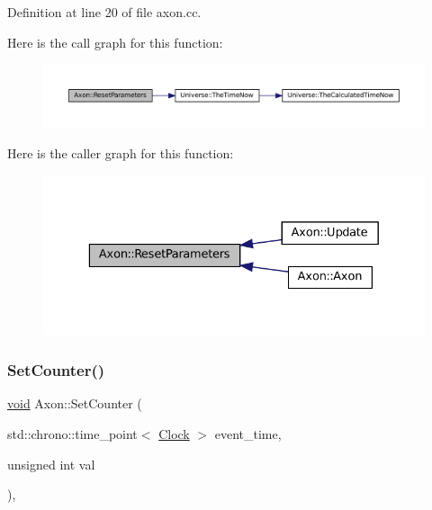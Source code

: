 Definition at line 20 of file axon.\+cc.

Here is the call graph for this function\+:\nopagebreak
\begin{figure}[H]
\begin{center}
\leavevmode
\includegraphics[width=350pt]{class_axon_ae079e0b47f5027625da158930e4fa9c5_cgraph}
\end{center}
\end{figure}
Here is the caller graph for this function\+:\nopagebreak
\begin{figure}[H]
\begin{center}
\leavevmode
\includegraphics[width=329pt]{class_axon_ae079e0b47f5027625da158930e4fa9c5_icgraph}
\end{center}
\end{figure}
\mbox{\label{class_axon_a3493cb97bde26bd66facc6084cd5f219}} 
\subsubsection{\texorpdfstring{Set\+Counter()}{SetCounter()}}
{\footnotesize\ttfamily \mbox{\hyperlink{glad_8h_a950fc91edb4504f62f1c577bf4727c29}{void}} Axon\+::\+Set\+Counter (\begin{DoxyParamCaption}\item[{std\+::chrono\+::time\+\_\+point$<$ \mbox{\hyperlink{universe_8h_a0ef8d951d1ca5ab3cfaf7ab4c7a6fd80}{Clock}} $>$}]{event\+\_\+time,  }\item[{unsigned int}]{val }\end{DoxyParamCaption})\hspace{0.3cm}{\ttfamily [inline]}, {\ttfamily [virtual]}}



